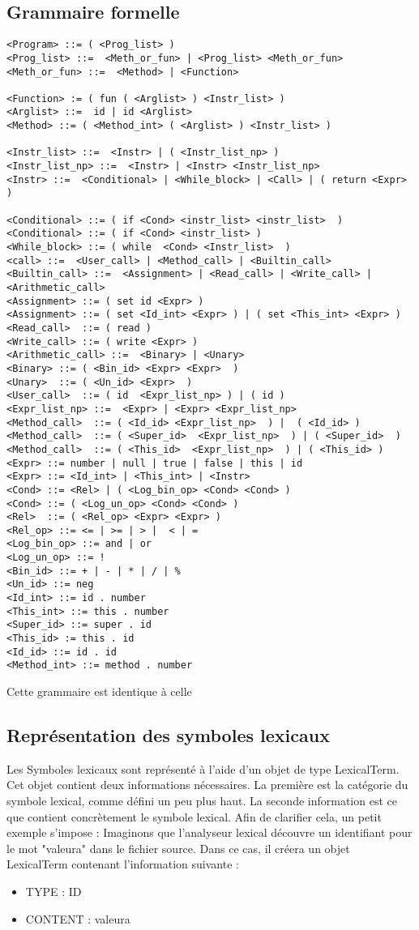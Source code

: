 \subsection{Grammaire formelle}
\begin{verbatim}
<Program> ::= ( <Prog_list> )
<Prog_list> ::=  <Meth_or_fun> | <Prog_list> <Meth_or_fun>	
<Meth_or_fun> ::=  <Method> | <Function>

<Function> := ( fun ( <Arglist> ) <Instr_list> ) 
<Arglist> ::=  id | id <Arglist>
<Method> ::= ( <Method_int> ( <Arglist> ) <Instr_list> )
 
<Instr_list> ::=  <Instr> | ( <Instr_list_np> ) 
<Instr_list_np> ::=  <Instr> | <Instr> <Instr_list_np>
<Instr> ::=  <Conditional> | <While_block> | <Call> | ( return <Expr> ) 

<Conditional> ::= ( if <Cond> <instr_list> <instr_list>  )  
<Conditional> ::= ( if <Cond> <instr_list> )
<While_block> ::= ( while  <Cond> <Instr_list>  ) 
<call> ::=  <User_call> | <Method_call> | <Builtin_call> 
<Builtin_call> ::=  <Assignment> | <Read_call> | <Write_call> | <Arithmetic_call>
<Assignment> ::= ( set id <Expr> ) 
<Assignment> ::= ( set <Id_int> <Expr> ) | ( set <This_int> <Expr> )
<Read_call>  ::= ( read )
<Write_call> ::= ( write <Expr> )
<Arithmetic_call> ::=  <Binary> | <Unary>
<Binary> ::= ( <Bin_id> <Expr> <Expr>  )
<Unary>  ::= ( <Un_id> <Expr>  )
<User_call>  ::= ( id  <Expr_list_np> ) | ( id ) 
<Expr_list_np> ::=  <Expr> | <Expr> <Expr_list_np>
<Method_call>  ::= ( <Id_id> <Expr_list_np>  ) |  ( <Id_id> )   
<Method_call>  ::= ( <Super_id>  <Expr_list_np>  ) | ( <Super_id>  )
<Method_call>  ::= ( <This_id>  <Expr_list_np>  ) | ( <This_id> )
<Expr> ::= number | null | true | false | this | id 
<Expr> ::= <Id_int> | <This_int> | <Instr>
<Cond> ::= <Rel> | ( <Log_bin_op> <Cond> <Cond> )
<Cond> ::= ( <Log_un_op> <Cond> <Cond> )
<Rel>  ::= ( <Rel_op> <Expr> <Expr> ) 
<Rel_op> ::= <= | >= | > |  < | =
<Log_bin_op> ::= and | or
<Log_un_op> ::= !
<Bin_id> ::= + | - | * | / | %
<Un_id> ::= neg
<Id_int> ::= id . number
<This_int> ::= this . number
<Super_id> ::= super . id
<This_id> := this . id 
<Id_id> ::= id . id
<Method_int> ::= method . number
\end{verbatim}
Cette grammaire est identique à celle 

\subsection{Représentation des symboles lexicaux}

Les Symboles lexicaux sont représenté à l'aide d'un objet de type LexicalTerm. Cet objet contient deux informations nécessaires. La première est la catégorie du symbole lexical, comme défini un peu plus haut. La seconde information est ce que contient concrètement le symbole lexical.
Afin de clarifier cela, un petit exemple s'impose : 
Imaginons que l'analyseur lexical découvre un identifiant pour le mot  "valeura" dans le fichier source. Dans ce cas, il créera un objet LexicalTerm contenant l'information suivante :
\begin{itemize}
	\item TYPE : ID
	\item CONTENT : valeura
\end{itemize}

